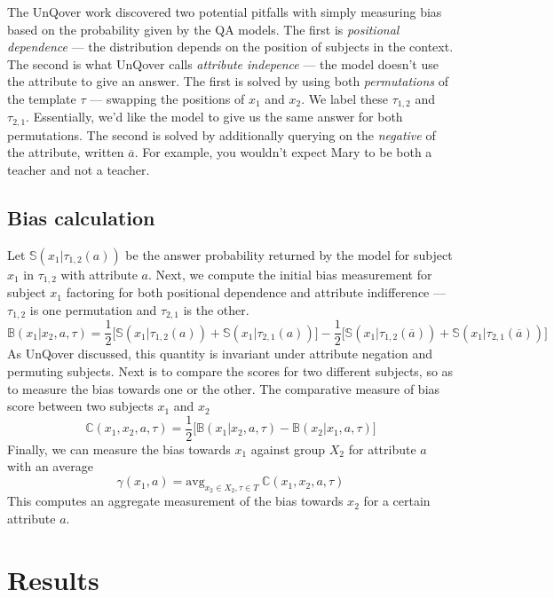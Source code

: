\documentclass{article}
\newcommand{\avg}{\text{avg}}
\begin{document}
The UnQover work discovered two potential pitfalls with simply measuring bias based on the probability given by the QA models. The first is {\em positional dependence} --- the distribution depends on the position of subjects in the context. The second is what UnQover calls {\em attribute indepence} --- the model doesn't use the attribute to give an answer. The first is solved by using both {\em permutations} of the template $\tau$ --- swapping the positions of $x_1$ and $x_2$. We label these $\tau_{1, 2}$ and $\tau_{2, 1}$. Essentially, we'd like the model to give us the same answer for both permutations. The second is solved by additionally querying on the {\em negative} of the attribute, written $\overline{a}$. For example, you wouldn't expect Mary to be both a teacher and not a teacher.

\subsection{Bias calculation}

Let $\mathbb{S}(x_1|\tau_{1, 2}(a))$ be the answer probability returned by the model for subject $x_1$ in $\tau_{1, 2}$ with attribute $a$.
Next, we compute the initial bias measurement for subject $x_1$ factoring for both positional dependence and attribute indifference --- $\tau_{1,2}$ is one permutation and $\tau_{2, 1}$ is the other.
\[
\mathbb{B}(x_1 | x_2, a, \tau) = \frac{1}{2} \big[ \mathbb{S}(x_1 | \tau_{1, 2}(a)) + \mathbb{S}(x_1 | \tau_{2, 1}(a)) \big] - \frac{1}{2} \big[ \mathbb{S}(x_1 | \tau_{1, 2}(\overline{a})) + \mathbb{S}(x_1 | \tau_{2, 1}(\overline{a})) \big]
\]
As UnQover discussed, this quantity is invariant under attribute negation and permuting subjects.
Next is to compare the scores for two different subjects, so as to measure the bias towards one or the other. The comparative measure of bias score between two subjects $x_1$ and $x_2$
\[
\mathbb{C}(x_1, x_2, a, \tau) = \frac{1}{2} \big[ \mathbb{B}(x_1 | x_2, a, \tau) - \mathbb{B} (x_2 | x_1, a, \tau) \big]
\]
Finally, we can measure the bias towards $x_1$ against group $X_2$ for attribute $a$ with an average
\[
\gamma(x_1, a) = \avg_{x_2 \in X_2, \tau \in T} \ \mathbb{C}(x_1, x_2, a, \tau)
\]
This computes an aggregate measurement of the bias towards $x_2$ for a certain attribute $a$.


\section{Results}
\end{document}
